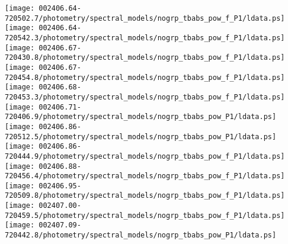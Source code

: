 \documentclass{aastex}
\begin{document}
\begin{figure*}[!ht]
\centering
\texttt{[image: 002406.64-720502.7/photometry/spectral\_models/nogrp\_tbabs\_pow\_f\_P1/ldata.ps]} \hfill 
\texttt{[image: 002406.64-720542.3/photometry/spectral\_models/nogrp\_tbabs\_pow\_f\_P1/ldata.ps]} \hfill 
\texttt{[image: 002406.67-720430.8/photometry/spectral\_models/nogrp\_tbabs\_pow\_f\_P1/ldata.ps]} \\ 
\vspace*{0.5in}
\texttt{[image: 002406.67-720454.8/photometry/spectral\_models/nogrp\_tbabs\_pow\_f\_P1/ldata.ps]} \hfill 
\texttt{[image: 002406.68-720453.3/photometry/spectral\_models/nogrp\_tbabs\_pow\_f\_P1/ldata.ps]} \hfill 
\texttt{[image: 002406.71-720406.9/photometry/spectral\_models/nogrp\_tbabs\_pow\_P1/ldata.ps]} \\ 
\vspace*{0.5in}
\texttt{[image: 002406.86-720512.5/photometry/spectral\_models/nogrp\_tbabs\_pow\_P1/ldata.ps]} \hfill 
\texttt{[image: 002406.86-720444.9/photometry/spectral\_models/nogrp\_tbabs\_pow\_f\_P1/ldata.ps]} \hfill 
\texttt{[image: 002406.88-720456.4/photometry/spectral\_models/nogrp\_tbabs\_pow\_f\_P1/ldata.ps]} \\ 
\vspace*{0.5in}
\texttt{[image: 002406.95-720509.8/photometry/spectral\_models/nogrp\_tbabs\_pow\_f\_P1/ldata.ps]} \hfill 
\texttt{[image: 002407.00-720459.5/photometry/spectral\_models/nogrp\_tbabs\_pow\_f\_P1/ldata.ps]} \hfill 
\texttt{[image: 002407.09-720442.8/photometry/spectral\_models/nogrp\_tbabs\_pow\_P1/ldata.ps]} \\ 
\vspace*{0.5in}
\end{figure*}
\clearpage
\end{document}
